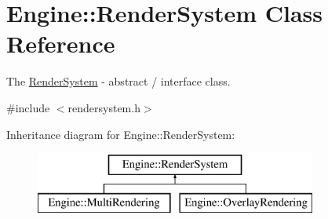 \hypertarget{classEngine_1_1RenderSystem}{}\section{Engine\+:\+:Render\+System Class Reference}
\label{classEngine_1_1RenderSystem}


The \hyperlink{classEngine_1_1RenderSystem}{Render\+System} -\/ abstract / interface class.  




{\ttfamily \#include $<$rendersystem.\+h$>$}

Inheritance diagram for Engine\+:\+:Render\+System\+:\begin{figure}[H]
\begin{center}
\leavevmode
\includegraphics[height=2.000000cm]{classEngine_1_1RenderSystem}
\end{center}
\end{figure}
